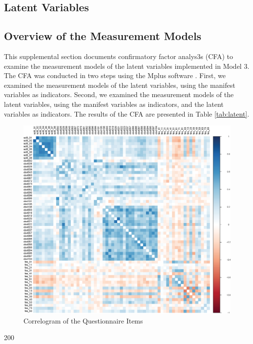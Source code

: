 \documentclass{sn-jnl}                  %
\begin{document}
\begin{appendices}

\section{Latent Variables}\label{app:latent}

\subsection{Overview of the Measurement Models}

This supplemental section documents confirmatory factor analys3s (CFA) to examine the measurement models of the latent variables implemented in Model 3. The CFA was conducted in two steps using the \textsf{Mplus} software \citep{muthen:2017}. First, we examined the measurement models of the latent variables, using the manifest variables as indicators. Second, we examined the measurement models of the latent variables, using the manifest variables as indicators, and the latent variables as indicators. The results of the CFA are presented in Table \ref{tab:latent}.

\begin{figure}[t]
    \caption{Correlogram of the Questionnaire Items}
    \label{fig:latent}
    \includegraphics[width=\textwidth]{latent.eps}
\end{figure}200


\end{appendices}
\end{document}
